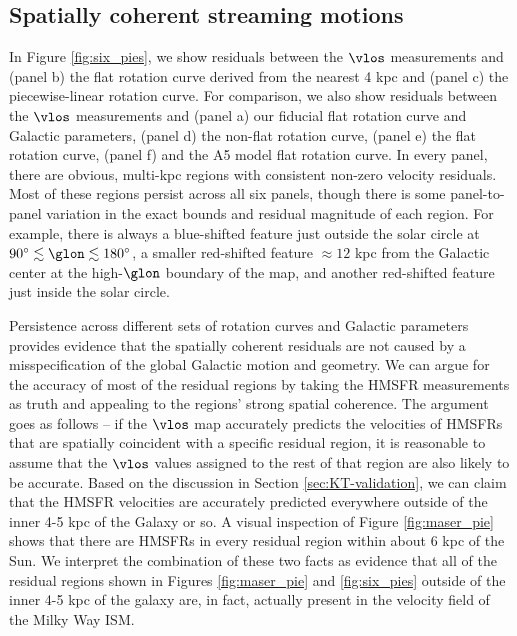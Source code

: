 \subsection{Spatially coherent streaming motions}
\label{sec:rotation_discussion}
In Figure \ref{fig:six_pies}, we show residuals between the $\vlos$ measurements and (panel b) the flat rotation curve derived from the nearest 4 kpc and (panel c) the piecewise-linear rotation curve. 
For comparison, we also show residuals between the $\vlos$ measurements and (panel a) our fiducial flat rotation curve and Galactic parameters, (panel d) the \Clemens non-flat rotation curve, (panel e) the \cite{2012ApJ...759..131B} flat rotation curve, (panel f) and the \Reid A5 model flat rotation curve.
In every panel, there are obvious, multi-kpc regions with consistent non-zero velocity residuals.
Most of these regions persist across all six panels, though there is some panel-to-panel variation in the exact bounds and residual magnitude of each region. 
For example, there is always a blue-shifted feature just outside the solar circle at $90^\circ \lesssim \glon \lesssim 180^\circ$, a smaller red-shifted feature $\approx 12$ kpc from the Galactic center at the high-$\glon$ boundary of the map, and another red-shifted feature just inside the solar circle. 

Persistence across different sets of rotation curves and Galactic parameters provides evidence that the spatially coherent residuals are not caused by a misspecification of the global Galactic motion and geometry.
We can argue for the accuracy of most of the residual regions by taking the HMSFR measurements as truth and appealing to the regions' strong spatial coherence.
The argument goes as follows -- if the $\vlos$ map accurately predicts the velocities of HMSFRs that are spatially coincident with a specific residual region, it is reasonable to assume that the $\vlos$ values assigned to the rest of that region are also likely to be accurate. 
Based on the discussion in Section \ref{sec:KT-validation}, we can claim that the HMSFR velocities are accurately predicted everywhere outside of the inner 4-5 kpc of the Galaxy or so.
A visual inspection of Figure \ref{fig:maser_pie} shows that there are HMSFRs in every residual region within about 6 kpc of the Sun. 
We interpret the combination of these two facts as evidence that all of the residual regions shown in Figures \ref{fig:maser_pie} and \ref{fig:six_pies} outside of the inner 4-5 kpc of the galaxy are, in fact, actually present in the velocity field of the Milky Way ISM. 


